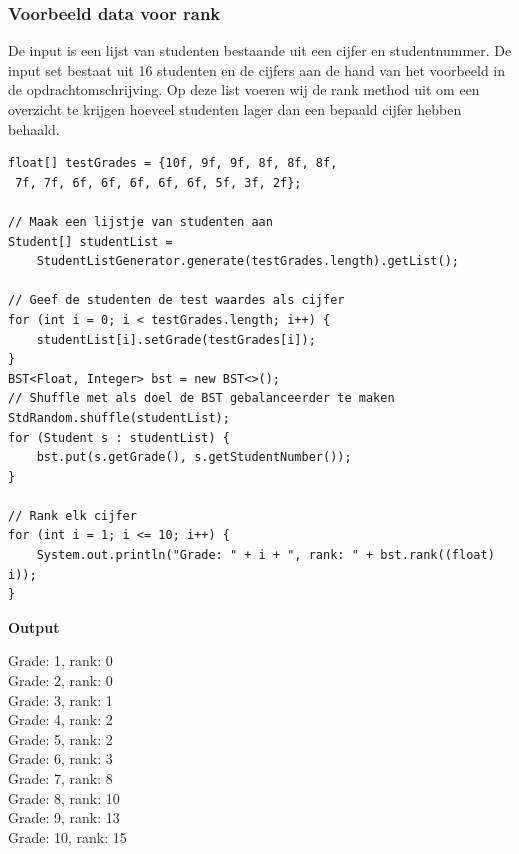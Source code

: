 \documentclass[12pt,notitlepage]{article}
\begin{document}
\clearpage
\subsubsection{Voorbeeld data voor rank}

De input is een lijst van studenten bestaande uit een cijfer en studentnummer. De input set bestaat uit 16 studenten en de cijfers aan de hand van het voorbeeld in de opdrachtomschrijving. Op deze list voeren wij de rank method uit om een overzicht te krijgen hoeveel studenten lager dan een bepaald cijfer hebben behaald.
\linebreak
\begin{lstlisting}
float[] testGrades = {10f, 9f, 9f, 8f, 8f, 8f,
 7f, 7f, 6f, 6f, 6f, 6f, 6f, 5f, 3f, 2f};

// Maak een lijstje van studenten aan
Student[] studentList = 
	StudentListGenerator.generate(testGrades.length).getList();

// Geef de studenten de test waardes als cijfer
for (int i = 0; i < testGrades.length; i++) {
    studentList[i].setGrade(testGrades[i]);
}
BST<Float, Integer> bst = new BST<>();
// Shuffle met als doel de BST gebalanceerder te maken
StdRandom.shuffle(studentList); 
for (Student s : studentList) {
    bst.put(s.getGrade(), s.getStudentNumber());
}

// Rank elk cijfer
for (int i = 1; i <= 10; i++) {
    System.out.println("Grade: " + i + ", rank: " + bst.rank((float) i));
}
\end{lstlisting}

\textbf{Output}

Grade: 1, rank: 0\\
Grade: 2, rank: 0\\
Grade: 3, rank: 1\\
Grade: 4, rank: 2\\
Grade: 5, rank: 2\\
Grade: 6, rank: 3\\
Grade: 7, rank: 8\\
Grade: 8, rank: 10\\
Grade: 9, rank: 13\\
Grade: 10, rank: 15\\
\end{document}
